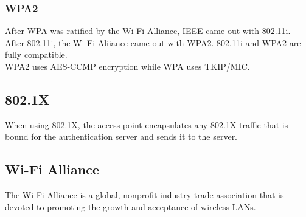 \subsubsection{WPA2}

After WPA was ratified by the Wi-Fi Alliance, IEEE came out with 802.11i.
After 802.11i, the Wi-Fi Aliiance came out with WPA2. 802.11i and WPA2 are
fully compatible.\\

WPA2 uses AES-CCMP encryption while WPA uses TKIP/MIC.

\subsection{802.1X}

When using 802.1X, the access point encapsulates any 802.1X traffic that is
bound for the authentication server and sends it to the server.

\subsection{Wi-Fi Alliance}

The Wi-Fi Alliance is a global, nonprofit industry trade association that is
devoted to promoting the growth and acceptance of wireless LANs.

